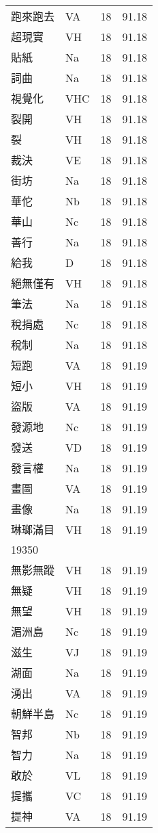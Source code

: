 \documentclass[twocolumn]{book}
\begin{document}
\begin{supertabular}{llrr}
跑來跑去 & VA & 18 &  91.18\\
超現實 & VH & 18 &  91.18\\
貼紙 & Na & 18 &  91.18\\
詞曲 & Na & 18 &  91.18\\
視覺化 & VHC & 18 &  91.18\\
裂開 & VH & 18 &  91.18\\
裂 & VH & 18 &  91.18\\
裁決 & VE & 18 &  91.18\\
街坊 & Na & 18 &  91.18\\
華佗 & Nb & 18 &  91.18\\
華山 & Nc & 18 &  91.18\\
善行 & Na & 18 &  91.18\\
給我 & D & 18 &  91.18\\
絕無僅有 & VH & 18 &  91.18\\
筆法 & Na & 18 &  91.18\\
稅捐處 & Nc & 18 &  91.18\\
稅制 & Na & 18 &  91.18\\
短跑 & VA & 18 &  91.19\\
短小 & VH & 18 &  91.19\\
盜版 & VA & 18 &  91.19\\
發源地 & Nc & 18 &  91.19\\
發送 & VD & 18 &  91.19\\
發言權 & Na & 18 &  91.19\\
畫圖 & VA & 18 &  91.19\\
畫像 & Na & 18 &  91.19\\
琳瑯滿目 & VH & 18 &  91.19\\
19350\\
無影無蹤 & VH & 18 &  91.19\\
無疑 & VH & 18 &  91.19\\
無望 & VH & 18 &  91.19\\
湄洲島 & Nc & 18 &  91.19\\
滋生 & VJ & 18 &  91.19\\
湖面 & Na & 18 &  91.19\\
湧出 & VA & 18 &  91.19\\
朝鮮半島 & Nc & 18 &  91.19\\
智邦 & Nb & 18 &  91.19\\
智力 & Na & 18 &  91.19\\
敢於 & VL & 18 &  91.19\\
提攜 & VC & 18 &  91.19\\
提神 & VA & 18 &  91.19\\

\end{supertabular}
\end{document}
